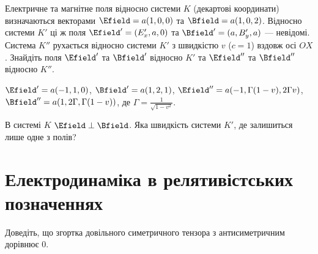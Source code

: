 \begin{problem}
Електричне та магнітне поля відносно системи $K$ (декартові координати) визначаються векторами $\Efield = a(1,0,0)$ та $\Bfield = a(1,0,2)$. Відносно системи $K'$ ці ж поля $\Efield' = (E_x',a,0)$ та $\Bfield' = (a,B_y',a)$ --- невідомі. Система $K''$ рухається відносно системи $K'$ з швидкістю $v$ ($c=1$) вздовж осі $OX$. Знайдіть поля  $\Efield'$ та $\Bfield'$ відносно $K'$ та $\Efield''$ та $\Bfield''$ відносно $K''$.
\begin{solution}
	$\Efield' = a(-1,1,0)$, $\Bfield' = a(1,2,1)$, $\Efield'' = a(-1,\Gamma(1- v),2\Gamma v)$, $\Bfield'' = a(1,2\Gamma,\Gamma(1- v))$, де $\Gamma = \frac{1}{\sqrt{1 - v^2}}$.
\end{solution}
\end{problem}



\begin{problem}
В системі $K$ $\Efield\perp\Bfield$. Яка швидкість системи $K'$,  де залишиться лише одне з полів?
\end{problem}


\section{Електродинаміка в релятивістських позначеннях}

\begin{problem}
Доведіть, що  згортка довільного симетричного тензора з антисиметричним дорівнює $0$.
\end{problem}

